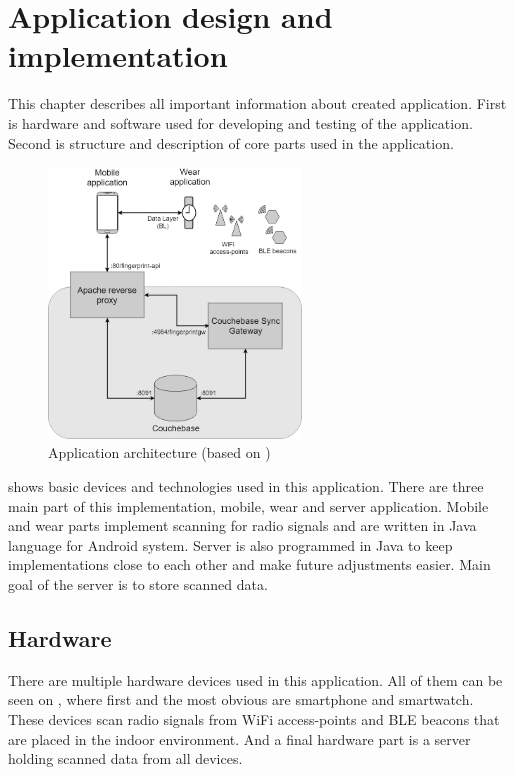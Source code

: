 \chapter{Application design and implementation}\label{sec:ApplicationDesingAndImplementation}
This chapter describes all important information about created application. First is hardware and software used for developing and testing of the application. Second is structure and description of core parts used in the application. 

\begin{figure}[H]
	\begin{centering}
		\includegraphics[width=0.6\textwidth]{img/server_architecture}
		\par\end{centering}
	\caption{Application architecture (based on \cite{IILUBLEB})}
	\label{fig057}
\end{figure}

 shows basic devices and technologies used in this application. There are three main part of this implementation, mobile, wear and server application. Mobile and wear parts implement scanning for radio signals and are written in Java language for Android system. Server is also programmed in Java to keep implementations close to each other and make future adjustments easier. Main goal of the server is to store scanned data.

\section{Hardware}\label{sec:Hardware}
There are multiple hardware devices used in this application. All of them can be seen on , where first and the most obvious are smartphone and smartwatch. These devices scan radio signals from WiFi access-points and BLE beacons that are placed in the indoor environment. And a final hardware part is a server holding scanned data from all devices.


